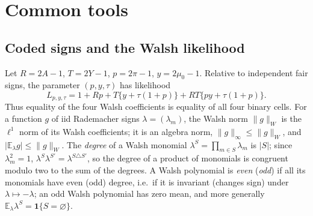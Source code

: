 \documentclass[11pt]{article}
\newcommand{\E}{\mathbb{E}}
\newcommand{\norm}[1]{\lVert #1\rVert}
\newcommand{\abs}[1]{\lvert #1\rvert}
\newcommand{\one}{\mathbf{1}}
\begin{document}
\section{Common tools}\label{sec:tools}

\subsection{Coded signs and the Walsh likelihood}
Let \(R=2A-1\), \(T=2Y-1\), \(p=2\pi-1\), \(y=2\mu_0-1\).  Relative to
independent fair signs, the parameter \((p,y,\tau)\) has likelihood
\begin{equation}
 L_{p,y,\tau}=1+Rp+T\{y+\tau(1+p)\}+RT\{py+\tau(1+p)\}.
 \label{eq:walsh}
\end{equation}
Thus equality of the four Walsh coefficients is equality of all four
binary cells.  For a function \(g\) of iid Rademacher signs
\(\lambda=(\lambda_m)\), the Walsh norm \(\norm g_W\) is the \(\ell^1\) norm
of its Walsh coefficients; it is an algebra norm,
\(\norm g_\infty\le\norm g_W\), and \(\abs{\E_\lambda g}\le\norm g_W\).  The
\emph{degree} of a Walsh monomial \(\lambda^S=\prod_{m\in S}\lambda_m\) is
\(\abs S\); since \(\lambda_m^2=1\), \(\lambda^S\lambda^{S'}=\lambda^{S\triangle S'}\),
so the degree of a product of monomials is congruent modulo two to the
sum of the degrees.  A Walsh polynomial is \emph{even} (\emph{odd}) if all
its monomials have even (odd) degree, i.e.\ if it is invariant (changes
sign) under \(\lambda\mapsto-\lambda\); an odd Walsh polynomial has zero
mean, and more generally \(\E_\lambda\lambda^S=\one\{S=\varnothing\}\).
\end{document}
